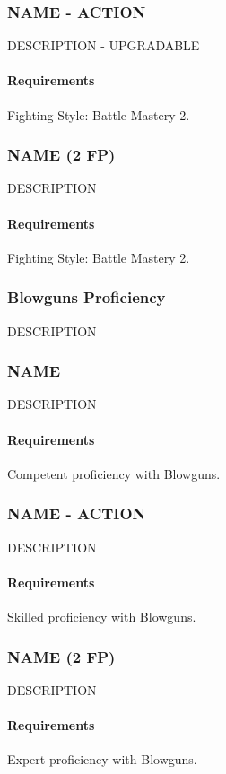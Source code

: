 \subsubsection{NAME - ACTION} \label{feat::name}
    DESCRIPTION - UPGRADABLE
    \paragraph{Requirements} Fighting Style: Battle Mastery 2.
\subsubsection{NAME (2 FP)} \label{feat::name}
    DESCRIPTION
    \paragraph{Requirements} Fighting Style: Battle Mastery 2.

\subsubsection{Blowguns Proficiency} \label{feat::name}
    DESCRIPTION
\subsubsection{NAME} \label{feat::name}
    DESCRIPTION
    \paragraph{Requirements} Competent proficiency with Blowguns.
\subsubsection{NAME - ACTION} \label{feat::name}
    DESCRIPTION
    \paragraph{Requirements} Skilled proficiency with Blowguns.
\subsubsection{NAME (2 FP)} \label{feat::name}
    DESCRIPTION
    \paragraph{Requirements} Expert proficiency with Blowguns.
